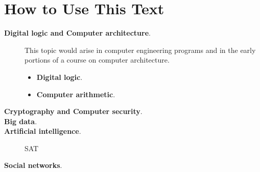 \section{How to Use This Text}
\label{sec:how-to-use}

\begin{description}
\item[{\bf Digital logic and Computer architecture}.]
 
This topic would arise in computer engineering programs and in the
early portions of a course on computer architecture.
\begin{itemize}
\item
{\bf Digital logic}. 
\item
{\bf Computer arithmetic}.  
\end{itemize}

\item[{\bf Cryptography and Computer security}.]


\item[{\bf Big data}.]


\item[{\bf Artificial intelligence}.]
SAT

\item[{\bf Social networks}.]

\end{description}





